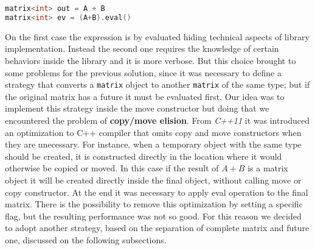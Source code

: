 \documentclass[11pt,a4paper]{article}
\begin{document}
\begin{lstlisting}[language=C++]
matrix<int> out = A + B
matrix<int> ev = (A+B).eval()
\end{lstlisting}
On the first case the expression is by evaluated hiding technical aspects of library implementation. Instead the second one requires the knowledge of certain behaviors inside the library and it is more verbose. But this choice brought to some problems for the previous solution, since it was necessary to define a strategy that converts a \verb|matrix| object to another \verb|matrix| of the same type; but if the original matrix has a future it must be evaluated first. Our idea was to implement this strategy inside the move constructor but doing that we encountered the problem of \textbf{copy/move elision}. From \textit{C++11} it was introduced an optimization to C++ compiler that omits copy and move constructors when they are unecessary. For instance, when a temporary object with the same type should be created, it is constructed directly in the location where it would otherwise be copied or moved. In this case if the result of $A+B$ is a matrix object it will be created directly inside the final object, without calling move or copy constructor. At the end it was necessary to apply eval operation to the final matrix. There is the possibility to remove this optimization by setting a specific flag, but the resulting performance was not so good. For this reason we decided to adopt another strategy, based on the separation of complete matrix and future one, discussed on the following subsections.
\end{document}
